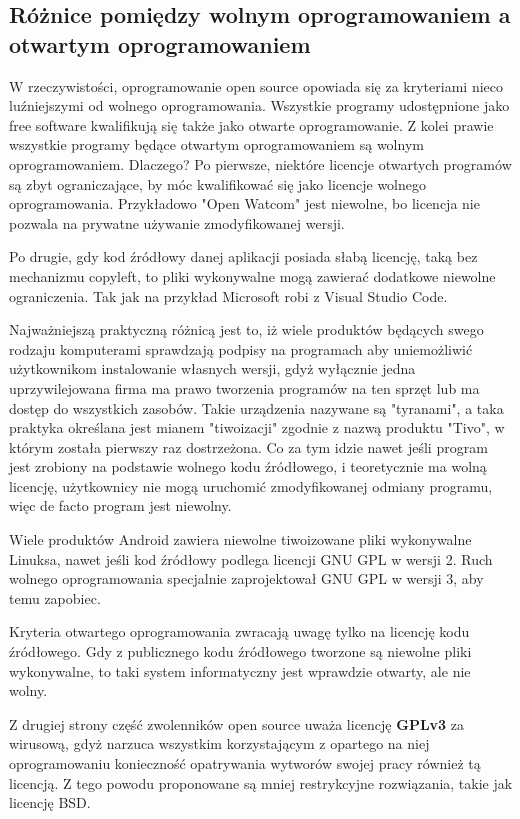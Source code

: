\documentclass{article}
\begin{document}
\subsection{Różnice pomiędzy wolnym oprogramowaniem a otwartym oprogramowaniem}

W rzeczywistości, oprogramowanie open source opowiada się za kryteriami nieco luźniejszymi od wolnego oprogramowania. Wszystkie programy udostępnione jako free software kwalifikują się także jako otwarte oprogramowanie. Z kolei prawie wszystkie programy będące otwartym oprogramowaniem są wolnym oprogramowaniem. Dlaczego? Po pierwsze, niektóre licencje otwartych programów są zbyt ograniczające, by móc kwalifikować się jako licencje wolnego oprogramowania. Przykładowo "Open Watcom" jest niewolne, bo licencja nie pozwala na prywatne używanie zmodyfikowanej wersji. 

Po drugie, gdy kod źródłowy danej aplikacji posiada słabą licencję, taką bez mechanizmu copyleft, to pliki wykonywalne mogą zawierać dodatkowe niewolne ograniczenia. Tak jak na przykład Microsoft robi z Visual Studio Code.

Najważniejszą praktyczną różnicą jest to, iż wiele produktów będących swego rodzaju komputerami sprawdzają podpisy na programach aby uniemożliwić użytkownikom instalowanie własnych wersji, gdyż wyłącznie jedna uprzywilejowana firma ma prawo tworzenia programów na ten sprzęt lub ma dostęp do wszystkich zasobów. Takie urządzenia nazywane są "tyranami", a taka praktyka określana jest mianem "tiwoizacji" zgodnie z nazwą produktu "Tivo", w którym została pierwszy raz dostrzeżona. Co za tym idzie nawet jeśli program jest zrobiony na podstawie wolnego kodu źródłowego, i teoretycznie ma wolną licencję, użytkownicy nie mogą uruchomić zmodyfikowanej odmiany programu, więc de facto program jest niewolny.

Wiele produktów Android zawiera niewolne tiwoizowane pliki wykonywalne Linuksa, nawet jeśli kod źródłowy podlega licencji GNU GPL w wersji 2.
Ruch wolnego oprogramowania specjalnie zaprojektował GNU GPL w wersji 3, aby temu zapobiec.

Kryteria otwartego oprogramowania zwracają uwagę tylko na licencję kodu źródłowego. Gdy z publicznego kodu źródłowego tworzone są niewolne pliki wykonywalne, to taki system informatyczny jest wprawdzie otwarty, ale nie wolny\cite{gnu.difference}.

Z drugiej strony część zwolenników open source uważa licencję \textbf{GPLv3} za wirusową, gdyż narzuca wszystkim korzystającym z opartego na niej oprogramowaniu konieczność opatrywania wytworów swojej pracy również tą licencją. Z tego powodu proponowane są mniej restrykcyjne rozwiązania, takie jak licencję BSD.
\end{document}
